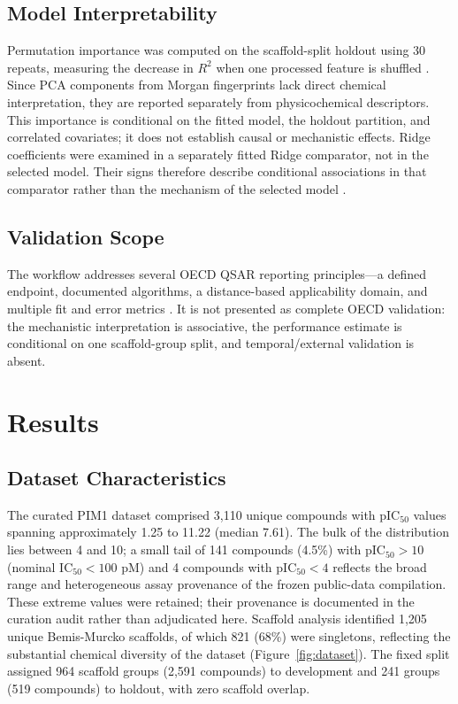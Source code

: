 \documentclass[11pt]{article}
\begin{document}
\subsection{Model Interpretability}

Permutation importance was computed on the scaffold-split holdout using 30 repeats,
measuring the decrease in $R^2$ when one processed feature is shuffled
\citep{breiman2001random}. Since PCA components from Morgan fingerprints lack direct
chemical interpretation, they are reported separately from physicochemical descriptors.
This importance is conditional on the fitted model, the holdout partition, and correlated
covariates; it does not establish causal or mechanistic effects. Ridge coefficients were
examined in a separately fitted Ridge comparator, not in the selected model. Their signs
therefore describe conditional associations in that comparator rather than the mechanism
of the selected model \citep{rodriguezperez2020interpretation}.

\subsection{Validation Scope}

The workflow addresses several OECD QSAR reporting principles---a defined endpoint,
documented algorithms, a distance-based applicability domain, and multiple fit and error
metrics \citep{oecd2007guidance}. It is not presented as complete OECD validation: the
mechanistic interpretation is associative, the performance estimate is conditional on one
scaffold-group split, and temporal/external validation is absent.

\section{Results}

\subsection{Dataset Characteristics}

The curated PIM1 dataset comprised 3,110 unique compounds with pIC$_{50}$ values
spanning approximately 1.25 to 11.22 (median 7.61).
The bulk of the distribution lies between 4 and 10; a small tail of 141 compounds
(4.5\%) with pIC$_{50} > 10$ (nominal IC$_{50} < 100$ pM) and 4 compounds with
pIC$_{50} < 4$ reflects the broad range and heterogeneous assay provenance of the
frozen public-data compilation. These extreme values were retained; their provenance
is documented in the curation audit rather than adjudicated here.
Scaffold analysis identified 1,205 unique Bemis-Murcko scaffolds, of which 821 (68\%)
were singletons, reflecting the substantial chemical diversity of the dataset
(Figure~\ref{fig:dataset}).
The fixed split assigned 964 scaffold groups (2,591 compounds) to development and
241 groups (519 compounds) to holdout, with zero scaffold overlap.
\end{document}
